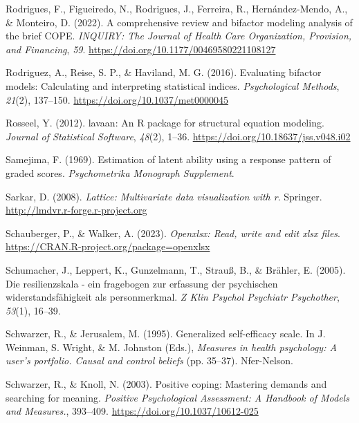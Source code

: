 \documentclass[
  man,floatsintext]{apa7}
\newlength{\cslhangindent}
\newenvironment{CSLReferences}[2] %
 {\begin{list}{}{%
  \setlength{\itemindent}{0pt}
  \setlength{\leftmargin}{0pt}
  \setlength{\parsep}{0pt}
  \ifodd #1
   \setlength{\leftmargin}{\cslhangindent}
   \setlength{\itemindent}{-1\cslhangindent}
  \fi
  \setlength{\itemsep}{#2\baselineskip}}}
 {\end{list}}
\begin{document}
\begin{CSLReferences}{1}{0}
Rodrigues, F., Figueiredo, N., Rodrigues, J., Ferreira, R., Hernández-Mendo, A., \& Monteiro, D. (2022). A comprehensive review and bifactor modeling analysis of the brief COPE. \emph{INQUIRY: The Journal of Health Care Organization, Provision, and Financing}, \emph{59}. \url{https://doi.org/10.1177/00469580221108127}

Rodriguez, A., Reise, S. P., \& Haviland, M. G. (2016). Evaluating bifactor models: {Calculating} and interpreting statistical indices. \emph{Psychological Methods}, \emph{21}(2), 137--150. \url{https://doi.org/10.1037/met0000045}

Rosseel, Y. (2012). {lavaan}: An {R} package for structural equation modeling. \emph{Journal of Statistical Software}, \emph{48}(2), 1--36. \url{https://doi.org/10.18637/jss.v048.i02}

Samejima, F. (1969). Estimation of latent ability using a response pattern of graded scores. \emph{Psychometrika Monograph Supplement}.

Sarkar, D. (2008). \emph{Lattice: Multivariate data visualization with r}. Springer. \url{http://lmdvr.r-forge.r-project.org}

Schauberger, P., \& Walker, A. (2023). \emph{Openxlsx: Read, write and edit xlsx files}. \url{https://CRAN.R-project.org/package=openxlsx}

Schumacher, J., Leppert, K., Gunzelmann, T., Strauß, B., \& Brähler, E. (2005). Die resilienzskala - ein fragebogen zur erfassung der psychischen widerstandsf{ä}higkeit als personmerkmal. \emph{Z Klin Psychol Psychiatr Psychother}, \emph{53}(1), 16--39.

Schwarzer, R., \& Jerusalem, M. (1995). Generalized self-efficacy scale. In J. Weinman, S. Wright, \& M. Johnston (Eds.), \emph{Measures in health psychology: A user's portfolio. Causal and control beliefs} (pp. 35--37). Nfer-Nelson.

Schwarzer, R., \& Knoll, N. (2003). Positive coping: {Mastering} demands and searching for meaning. \emph{Positive Psychological Assessment: A Handbook of Models and Measures.}, 393--409. \url{https://doi.org/10.1037/10612-025}


\end{CSLReferences}
\end{document}
